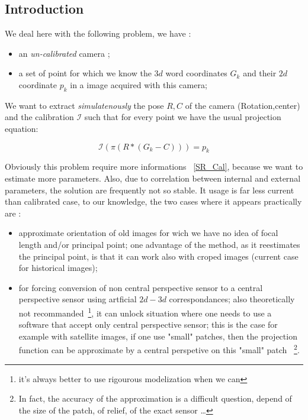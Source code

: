 \subsection{Introduction}

We deal here with the following problem,  we have :

\begin{itemize}
   \item an \emph{un-calibrated} camera ;
   \item a set of point for which we know the  $3d$ word coordinates $G_k$ and their 
        $2d$ coordinate $p_k$ in a image acquired with this camera;
\end{itemize}


We want to extract \emph{simulatenously} the pose $R,C$ of the camera (Rotation,center)  and the calibration
$\mathcal I$ such that for every point we have the usual projection equation:

\begin{equation}
       \mathcal I(\pi (R*(G_k-C))) = p_k \label{EQ:PROJ}
\end{equation}

Obviously this problem require more informations ~\ref{SR_Cal}, because we want to estimate more parameters.
Also, due to correlation between internal and external parameters, the solution
are frequently not so stable. It usage is far less current than calibrated case,
to our knowledge, the two cases where it appears practically are :


\begin{itemize}
   \item approximate  orientation of old images for wich we have no idea of focal length and/or principal
        point; one advantage of the method, as it reestimates the principal point, is that it can work
        also with croped images (current case for historical images);

   \item for forcing conversion of  non central perspective sensor to a central perspective sensor
        using  artficial $2d-3d$ correspondances; also theoretically not recommanded~\footnote{it's
        always better to use rigourous modelization when we can}, it can unlock situation where one needs to
        use a software that accept only central perspective sensor; this is the case for example
        with satellite images, if one use "small" patches, then the projection  function can be
        approximate by a central perspetive on this "small" patch ~\footnote{In fact, the accuracy of
        the approximation is a difficult question, depend of the size of the patch, of relief, 
        of the exact sensor \dots}.
\end{itemize}

